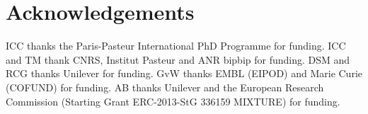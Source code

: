 \documentclass{bioinfo}
\begin{document}
\section{Acknowledgements}
ICC thanks the Paris-Pasteur International PhD Programme for funding.
ICC and TM thank CNRS, Institut Pasteur and ANR bipbip for funding.
DSM and RCG thanks Unilever for funding.
GvW thanks EMBL (EIPOD) and Marie Curie (COFUND) for funding.
AB thanks Unilever and the European Research Commission (Starting Grant ERC-2013-StG 336159 MIXTURE) for funding.



\end{document}
